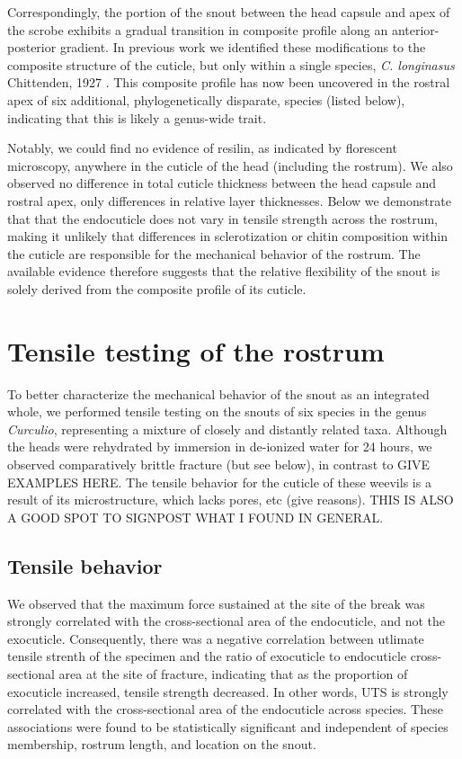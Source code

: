 \documentclass[twocolumn, linenumbers, superscriptaddress]{revtex4-1}
\begin{document}
		Correspondingly, the portion of the snout between the head capsule and apex of the scrobe exhibits a gradual transition in composite profile along an anterior-posterior gradient.		
		In previous work we identified these modifications to the composite structure of the cuticle, but only within a single species, \textit{C. longinasus} Chittenden, 1927 \cite{Jansen2016, Singh2016}.
		This composite profile has now been uncovered in the rostral apex of six additional, phylogenetically disparate, species (listed below), indicating that this is likely a genus-wide trait.
		
		Notably, we could find no evidence of resilin, as indicated by florescent microscopy, anywhere in the cuticle of the head (including the rostrum).
		We also observed no difference in total cuticle thickness between the head capsule and rostral apex, only differences in relative layer thicknesses.
		Below we demonstrate that that the endocuticle does not vary in tensile strength across the rostrum, making it unlikely that differences in sclerotization or chitin composition within the cuticle are responsible for the mechanical behavior of the rostrum.
		The available evidence therefore suggests that the relative flexibility of the snout is solely derived from the composite profile of its cuticle.
	
	\section{Tensile testing of the rostrum} %
		To better characterize the mechanical behavior of the snout as an integrated whole, we performed tensile testing on the snouts of six species in the genus \textit{Curculio}, representing a mixture of closely and distantly related taxa.
		Although the heads were rehydrated by immersion in de-ionized water for 24 hours, we observed comparatively brittle fracture (but see below), in contrast to GIVE EXAMPLES HERE.
		The tensile behavior for the cuticle of these weevils is a result of its microstructure, which lacks pores, etc (give reasons).
		THIS IS ALSO A GOOD SPOT TO SIGNPOST WHAT I FOUND IN GENERAL.
		
		\subsection{Tensile behavior}
			We observed that the maximum force sustained at the site of the break was strongly correlated with the cross-sectional area of the endocuticle, and not the exocuticle.
			Consequently, there was a negative correlation between utlimate tensile strenth of the specimen and the ratio of exocuticle to endocuticle cross-sectional area at the site of fracture, indicating that as the proportion of exocuticle increased, tensile strength decreased.
			In other words, UTS is strongly correlated with the cross-sectional area of the endocuticle across species.
			These associations were found to be statistically significant and independent of species membership, rostrum length, and location on the snout.
			
\end{document}
